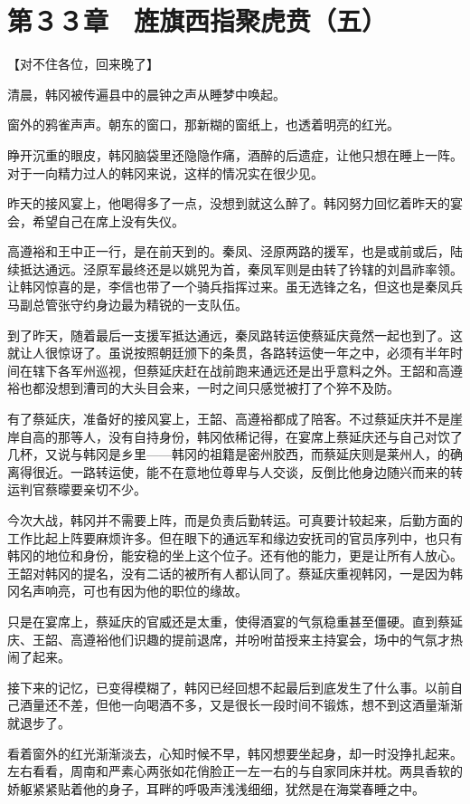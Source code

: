 \section{第３３章　旌旗西指聚虎贲（五）}

【对不住各位，回来晚了】

清晨，韩冈被传遍县中的晨钟之声从睡梦中唤起。

窗外的鸦雀声声。朝东的窗口，那新糊的窗纸上，也透着明亮的红光。

睁开沉重的眼皮，韩冈脑袋里还隐隐作痛，酒醉的后遗症，让他只想在睡上一阵。对于一向精力过人的韩冈来说，这样的情况实在很少见。

昨天的接风宴上，他喝得多了一点，没想到就这么醉了。韩冈努力回忆着昨天的宴会，希望自己在席上没有失仪。

高遵裕和王中正一行，是在前天到的。秦凤、泾原两路的援军，也是或前或后，陆续抵达通远。泾原军最终还是以姚兕为首，秦凤军则是由转了钤辖的刘昌祚率领。让韩冈惊喜的是，李信也带了一个骑兵指挥过来。虽无选锋之名，但这也是秦凤兵马副总管张守约身边最为精锐的一支队伍。

到了昨天，随着最后一支援军抵达通远，秦凤路转运使蔡延庆竟然一起也到了。这就让人很惊讶了。虽说按照朝廷颁下的条贯，各路转运使一年之中，必须有半年时间在辖下各军州巡视，但蔡延庆赶在战前跑来通远还是出乎意料之外。王韶和高遵裕也都没想到漕司的大头目会来，一时之间只感觉被打了个猝不及防。

有了蔡延庆，准备好的接风宴上，王韶、高遵裕都成了陪客。不过蔡延庆并不是崖岸自高的那等人，没有自持身份，韩冈依稀记得，在宴席上蔡延庆还与自己对饮了几杯，又说与韩冈是乡里——韩冈的祖籍是密州胶西，而蔡延庆则是莱州人，的确离得很近。一路转运使，能不在意地位尊卑与人交谈，反倒比他身边随兴而来的转运判官蔡曚要亲切不少。

今次大战，韩冈并不需要上阵，而是负责后勤转运。可真要计较起来，后勤方面的工作比起上阵要麻烦许多。但在眼下的通远军和缘边安抚司的官员序列中，也只有韩冈的地位和身份，能安稳的坐上这个位子。还有他的能力，更是让所有人放心。王韶对韩冈的提名，没有二话的被所有人都认同了。蔡延庆重视韩冈，一是因为韩冈名声响亮，可也有因为他的职位的缘故。

只是在宴席上，蔡延庆的官威还是太重，使得酒宴的气氛稳重甚至僵硬。直到蔡延庆、王韶、高遵裕他们识趣的提前退席，并吩咐苗授来主持宴会，场中的气氛才热闹了起来。

接下来的记忆，已变得模糊了，韩冈已经回想不起最后到底发生了什么事。以前自己酒量还不差，但他一向喝酒不多，又是很长一段时间不锻炼，想不到这酒量渐渐就退步了。

看着窗外的红光渐渐淡去，心知时候不早，韩冈想要坐起身，却一时没挣扎起来。左右看看，周南和严素心两张如花俏脸正一左一右的与自家同床并枕。两具香软的娇躯紧紧贴着他的身子，耳畔的呼吸声浅浅细细，犹然是在海棠春睡之中。

